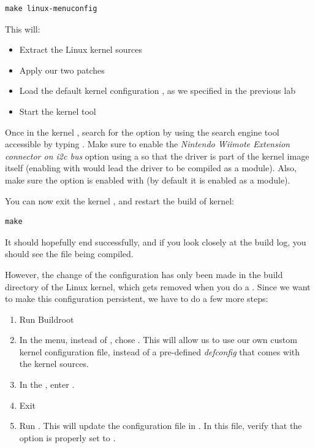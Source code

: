 \begin{verbatim}
make linux-menuconfig
\end{verbatim}

This will:

\begin{itemize}
\item Extract the Linux kernel sources
\item Apply our two patches
\item Load the default kernel configuration
  , as we specified in the previous lab
\item Start the kernel  tool
\end{itemize}

Once in the kernel , search for the option
 by using the search engine tool
accessible by typing \code{/}. Make sure to enable the {\em Nintendo
  Wiimote Extension connector on i2c bus} option using a \code{*} so
that the driver is part of the kernel image itself (enabling with
 would lead the driver to be compiled as a module). Also, make
sure the  option is enabled with \code{*} (by
default it is enabled as a module).

You can now exit the kernel , and restart the build
of kernel:

\begin{verbatim}
make
\end{verbatim}

It should hopefully end successfully, and if you look closely at the
build log, you should see the file  being compiled.

However, the change of the configuration has only been made in the
build directory of the Linux kernel, which gets removed when you do a
. Since we want to make this configuration
persistent, we have to do a few more steps:

\begin{enumerate}

\item Run Buildroot 

\item In the  menu, instead of ,
  chose . This will allow us to use
  our own custom kernel configuration file, instead of a pre-defined
  {\em defconfig} that comes with the kernel sources.

\item In the , enter
  .

\item Exit 

\item Run . This will update the
  configuration file in
  . In this file,
  verify that the option  is properly
  set to .

\end{enumerate}

